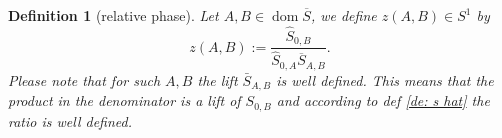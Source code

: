 \documentclass[b5paper,draft,openbib,12pt]{memoir}
\newtheorem{Def}{Definition}
\DeclareMathOperator{\dom}{dom}
\begin{document}




\begin{Def}[relative phase]
Let \(A,B \in\dom\overline{S}\), we define \(z(A,B)\in S^1\) by
\begin{equation}\label{def z}
z(A,B):=\frac{\hat{S}_{0,B}}{\hat{S}_{0,A}\overline{S}_{A,B}}.
\end{equation}
Please note that for such \(A,B\) the lift \(\bar{S}_{A,B}\) is well defined. This means that the product in the denominator is a lift of \(S_{0,B}\)
and according to def \ref{de: s hat} the ratio is well defined.
\end{Def}
\end{document}

